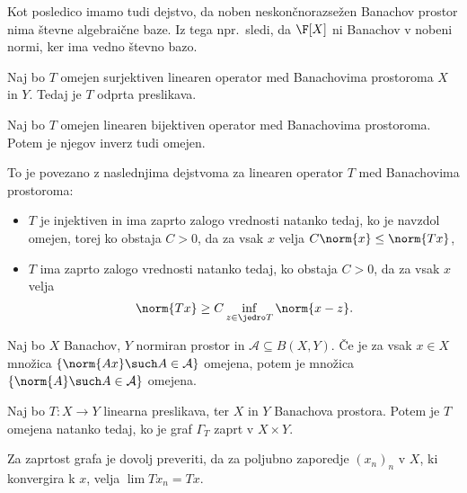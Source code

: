 Kot posledico imamo tudi dejstvo, da noben neskončnorazsežen Banachov prostor
nima števne algebraične baze.
Iz tega npr.~sledi, da $\F[X]$ ni Banachov v nobeni normi, ker ima vedno števno
bazo.


\begin{izrek}
  Naj bo $T$ omejen surjektiven linearen operator med Banachovima prostoroma $X$
  in $Y$.
  Tedaj je $T$ odprta preslikava.
\end{izrek}

\begin{posledica}
  Naj bo $T$ omejen linearen bijektiven operator med Banachovima prostoroma.
  Potem je njegov inverz tudi omejen.
\end{posledica}

To je povezano z naslednjima dejstvoma za linearen operator $T$ med Banachovima
prostoroma:
\begin{itemize}
\item $T$ je injektiven in ima zaprto zalogo vrednosti natanko tedaj, ko je
  navzdol omejen, torej ko obstaja $C > 0$, da za vsak $x$ velja $C \norm{x} \le
  \norm{Tx}$,
\item $T$ ima zaprto zalogo vrednosti natanko tedaj, ko obstaja $C > 0$, da za
  vsak $x$ velja
  \[
	\norm{Tx} \ge C \inf_{z \in \jedro T} \norm{x - z}.
  \]
\end{itemize}


\begin{izrek}
  Naj bo $X$ Banachov, $Y$ normiran prostor in $\mathcal{A} \subseteq B(X,Y)$.
  Če je za vsak $x \in X$ množica $\{ \norm{Ax} \such A \in \mathcal{A} \}$
  omejena, potem je množica $\{ \norm{A} \such A \in \mathcal{A} \}$ omejena.
\end{izrek}


\begin{izrek}
  Naj bo $T: X \to Y$ linearna preslikava, ter $X$ in $Y$ Banachova prostora.
  Potem je $T$ omejena natanko tedaj, ko je graf $\Gamma_T$ zaprt v $X \times Y$.
\end{izrek}

Za zaprtost grafa je dovolj preveriti, da za poljubno zaporedje $(x_n)_n$ v $X$,
ki konvergira k $x$, velja $\lim T x_n = Tx$.


